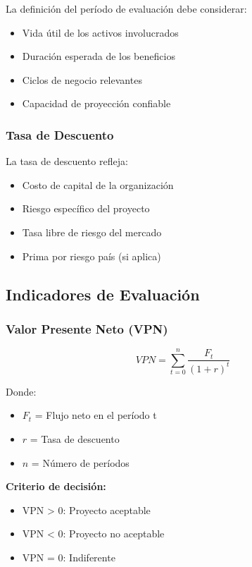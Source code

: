 \documentclass[12pt,letterpaper,oneside]{book}
\begin{document}
La definición del período de evaluación debe considerar:
\begin{itemize}
\item Vida útil de los activos involucrados
\item Duración esperada de los beneficios
\item Ciclos de negocio relevantes
\item Capacidad de proyección confiable
\end{itemize}

\subsubsection{Tasa de Descuento}

La tasa de descuento refleja:
\begin{itemize}
\item Costo de capital de la organización
\item Riesgo específico del proyecto
\item Tasa libre de riesgo del mercado
\item Prima por riesgo país (si aplica)
\end{itemize}

\subsection{Indicadores de Evaluación}

\subsubsection{Valor Presente Neto (VPN)}

\begin{equation}
VPN = \sum_{t=0}^{n} \frac{F_t}{(1+r)^t}
\end{equation}

Donde:
\begin{itemize}
\item $F_t$ = Flujo neto en el período t
\item $r$ = Tasa de descuento
\item $n$ = Número de períodos
\end{itemize}

\textbf{Criterio de decisión:}
\begin{itemize}
\item VPN > 0: Proyecto aceptable
\item VPN < 0: Proyecto no aceptable
\item VPN = 0: Indiferente
\end{itemize}
\end{document}

